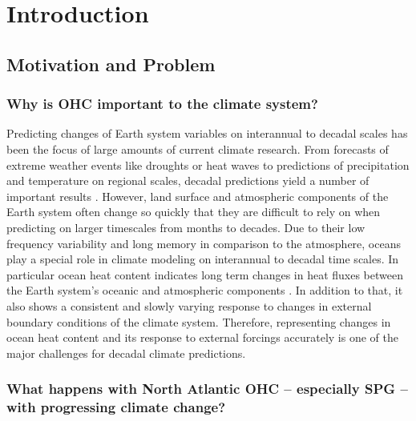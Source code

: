 \documentclass[Masterarbeit.tex]{subfile}
\begin{document}
	
	\chapter{Introduction}
	
	\section{Motivation and Problem}
	
	\subsection{Why is OHC important to the climate system?}
	Predicting changes of Earth system variables on interannual to decadal scales has been the focus of large amounts of current climate research. From forecasts of extreme weather events like droughts or heat waves to predictions of precipitation and temperature on regional scales, decadal predictions yield a number of important results \citep{marotzke_miklip_2016, keenlyside_prospects_2010}. However, land surface and atmospheric components of the Earth system often change so quickly that they are difficult to rely on when predicting on larger timescales from months to decades. Due to their low frequency variability and long memory in comparison to the atmosphere, oceans play a special role in climate modeling on interannual to decadal time scales. In particular ocean heat content indicates long term changes in heat fluxes between the Earth system's oceanic and atmospheric components \citep{cheng_improved_2017}. In addition to that, it also shows a consistent and slowly varying response to changes in external boundary conditions of the climate system. Therefore, representing changes in ocean heat content and its response to external forcings accurately is one of the major challenges for decadal climate predictions.\\
	
	\subsection{What happens with North Atlantic OHC -- especially SPG -- with progressing climate change?}
\end{document}

